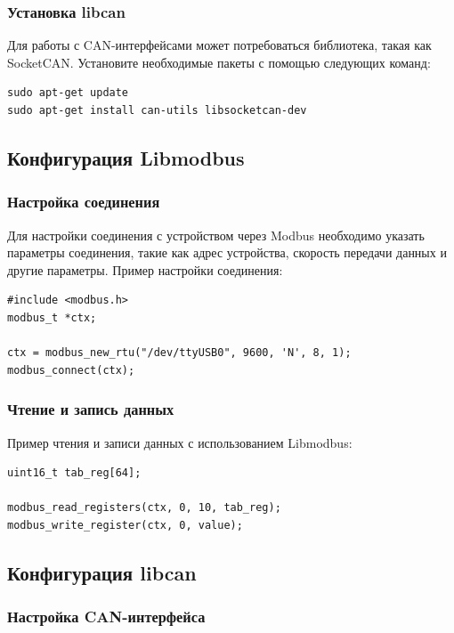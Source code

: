 \documentclass[16pt]{article}
\begin{document}
\subsubsection{Установка libcan}

Для работы с CAN-интерфейсами может потребоваться библиотека, такая как SocketCAN. Установите необходимые пакеты с помощью следующих команд:

\begin{verbatim}
sudo apt-get update
sudo apt-get install can-utils libsocketcan-dev
\end{verbatim}

\subsection{Конфигурация Libmodbus}

\subsubsection{Настройка соединения}

Для настройки соединения с устройством через Modbus необходимо указать параметры соединения, такие как адрес устройства, скорость передачи данных и другие параметры. Пример настройки соединения:

\begin{verbatim}
#include <modbus.h>
modbus_t *ctx;

ctx = modbus_new_rtu("/dev/ttyUSB0", 9600, 'N', 8, 1);
modbus_connect(ctx);
\end{verbatim}

\subsubsection{Чтение и запись данных}

Пример чтения и записи данных с использованием Libmodbus:

\begin{verbatim}
uint16_t tab_reg[64];

modbus_read_registers(ctx, 0, 10, tab_reg);
modbus_write_register(ctx, 0, value);
\end{verbatim}

\subsection{Конфигурация libcan}

\subsubsection{Настройка CAN-интерфейса}
\end{document}
